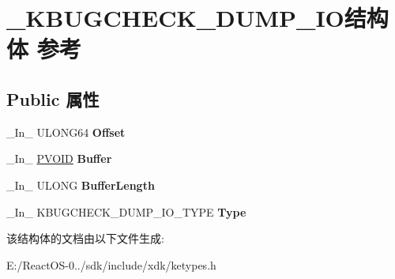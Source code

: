 \hypertarget{struct___k_b_u_g_c_h_e_c_k___d_u_m_p___i_o}{}\section{\+\_\+\+K\+B\+U\+G\+C\+H\+E\+C\+K\+\_\+\+D\+U\+M\+P\+\_\+\+I\+O结构体 参考}
\label{struct___k_b_u_g_c_h_e_c_k___d_u_m_p___i_o}
\subsection*{Public 属性}
\begin{DoxyCompactItemize}
\item 
\mbox{\label{struct___k_b_u_g_c_h_e_c_k___d_u_m_p___i_o_a819f2073f4ee5e89798a28aa2d5058e5}} 
\+\_\+\+In\+\_\+ U\+L\+O\+N\+G64 {\bfseries Offset}
\item 
\mbox{\label{struct___k_b_u_g_c_h_e_c_k___d_u_m_p___i_o_ad87c15c455974838b47ad3134747d819}} 
\+\_\+\+In\+\_\+ \hyperlink{interfacevoid}{P\+V\+O\+ID} {\bfseries Buffer}
\item 
\mbox{\label{struct___k_b_u_g_c_h_e_c_k___d_u_m_p___i_o_a954949b530399e8007c44e115790e3a8}} 
\+\_\+\+In\+\_\+ U\+L\+O\+NG {\bfseries Buffer\+Length}
\item 
\mbox{\label{struct___k_b_u_g_c_h_e_c_k___d_u_m_p___i_o_accfb2e3469e16dd4910fac2f710486ae}} 
\+\_\+\+In\+\_\+ K\+B\+U\+G\+C\+H\+E\+C\+K\+\_\+\+D\+U\+M\+P\+\_\+\+I\+O\+\_\+\+T\+Y\+PE {\bfseries Type}
\end{DoxyCompactItemize}


该结构体的文档由以下文件生成\+:\begin{DoxyCompactItemize}
\item 
E\+:/\+React\+O\+S-\/0../sdk/include/xdk/ketypes.\+h\end{DoxyCompactItemize}
